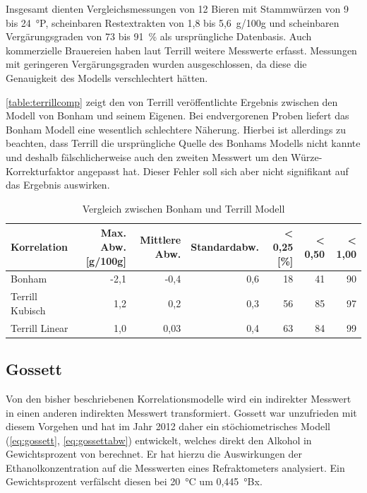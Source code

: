 \documentclass[a4paper,parskip=half]{scrartcl}
\begin{document}
Insgesamt dienten Vergleichsmessungen von 12 Bieren mit Stammwürzen
von 9 bis 24~°P, scheinbaren Restextrakten von 1,8 bis
5,6~g/100g und scheinbaren Vergärungsgraden von 73 bis 91~\%
als ursprüngliche Datenbasis. Auch kommerzielle Brauereien haben
laut Terrill weitere Messwerte erfasst. Messungen mit geringeren
Vergärungsgraden wurden ausgeschlossen, da diese die Genauigkeit des
Modells verschlechtert hätten.
\autocite{Terrill2010a,Terrill2011,Terrill2010,Terrill2013}

\autoref{table:terrillcomp} zeigt den von Terrill veröffentlichte
Ergebnis zwischen den Modell von Bonham und seinem Eigenen. Bei
endvergorenen Proben liefert das Bonham Modell eine wesentlich
schlechtere Näherung. Hierbei ist allerdings zu beachten, dass
Terrill die ursprüngliche Quelle des Bonhams Modells nicht kannte
und deshalb fälschlicherweise auch den zweiten Messwert um
den Würze-Korrekturfaktor angepasst hat. Dieser Fehler soll sich
aber nicht signifikant auf das Ergebnis auswirken.
\autocite{Terrill2010a,Terrill2011,Terrill2010}

\begin{table}[h]
\centering
\begin{tabular}{lrrrrrr}
\toprule
Korrelation &  Max. Abw. [g/100g] & Mittlere Abw. & Standardabw. & < 0,25 [\%] & < 0,50 & < 1,00 \\
\midrule
Bonham & -2,1 & -0,4 & 0,6 & 18 & 41 & 90 \\
Terrill Kubisch & 1,2 & 0,2 & 0,3 & 56 & 85 & 97 \\
Terrill Linear & 1,0 & 0,03 & 0,4 & 63 & 84 & 99 \\
\bottomrule
\end{tabular}
\caption{Vergleich zwischen Bonham und Terrill Modell}
\label{table:terrillcomp}
\end{table}

\subsection*{Gossett}

Von den bisher beschriebenen Korrelationsmodelle wird ein indirekter
Messwert in einen anderen indirekten Messwert transformiert. Gossett
war unzufrieden mit diesem Vorgehen und hat im Jahr 2012 daher ein
stöchiometrisches Modell (\autoref{eq:gossett}, \autoref{eq:gossettabw})
entwickelt, welches direkt den Alkohol in Gewichtsprozent von
berechnet. Er hat hierzu die Auswirkungen der Ethanolkonzentration
auf die Messwerten eines Refraktometers analysiert. Ein Gewichtsprozent
verfälscht diesen bei 20~°C um 0,445~°Bx. 
\autocite{Gossett2012,Gossett2012a,Gossett2012b}
\end{document}
